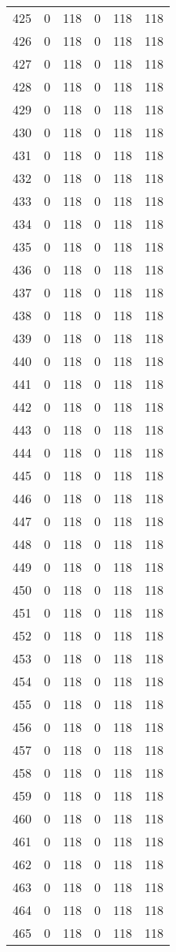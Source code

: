 \documentclass[a4paper]{ctexart}
\begin{document}
\begin{longtable}{p{1cm}|p{2cm}|p{2cm}|p{2cm}|P{2cm}|p{2cm}}
		425&0&118&0&118&118\\
		426&0&118&0&118&118\\
		427&0&118&0&118&118\\
		428&0&118&0&118&118\\
		429&0&118&0&118&118\\
		430&0&118&0&118&118\\
		431&0&118&0&118&118\\
		432&0&118&0&118&118\\
		433&0&118&0&118&118\\
		434&0&118&0&118&118\\
		435&0&118&0&118&118\\
		436&0&118&0&118&118\\
		437&0&118&0&118&118\\
		438&0&118&0&118&118\\
		439&0&118&0&118&118\\
		440&0&118&0&118&118\\
		441&0&118&0&118&118\\
		442&0&118&0&118&118\\
		443&0&118&0&118&118\\
		444&0&118&0&118&118\\
		445&0&118&0&118&118\\
		446&0&118&0&118&118\\
		447&0&118&0&118&118\\
		448&0&118&0&118&118\\
		449&0&118&0&118&118\\
		450&0&118&0&118&118\\
		451&0&118&0&118&118\\
		452&0&118&0&118&118\\
		453&0&118&0&118&118\\
		454&0&118&0&118&118\\
		455&0&118&0&118&118\\
		456&0&118&0&118&118\\
		457&0&118&0&118&118\\
		458&0&118&0&118&118\\
		459&0&118&0&118&118\\
		460&0&118&0&118&118\\
		461&0&118&0&118&118\\
		462&0&118&0&118&118\\
		463&0&118&0&118&118\\
		464&0&118&0&118&118\\
		465&0&118&0&118&118\\

\end{longtable}
\end{document}
